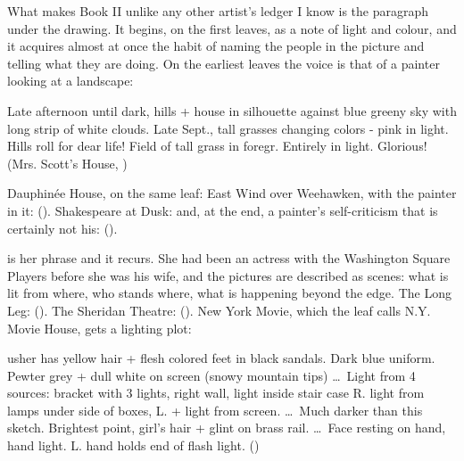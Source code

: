 What makes Book II unlike any other artist's ledger I know is the paragraph under the drawing. It begins, on the first leaves, as a note of light and colour, and it acquires almost at once the habit of naming the people in the picture and telling what they are doing. On the earliest leaves the voice is that of a painter looking at a landscape:

\begin{leafquote}
Late afternoon until dark, hills + house in silhouette against blue greeny sky with long strip of white clouds. Late Sept., tall grasses changing colors - pink in light. Hills roll for dear life! Field of tall grass in foregr. Entirely in light. Glorious! \hfill (Mrs. Scott's House, )
\end{leafquote}

\noindent Dauphinée House, on the same leaf:  East Wind over Weehawken, with the painter in it:  (). Shakespeare at Dusk:  and, at the end, a painter's self-criticism that is certainly not his:  ().

 is her phrase and it recurs. She had been an actress with the Washington Square Players before she was his wife, and the pictures are described as scenes: what is lit from where, who stands where, what is happening beyond the edge. The Long Leg:  (). The Sheridan Theatre:  (). New York Movie, which the leaf calls N.Y. Movie House, gets a lighting plot:

\begin{leafquote}
usher has yellow hair + flesh colored feet in black sandals. Dark blue uniform. Pewter grey + dull white on screen (snowy mountain tips) \ldots\ Light from 4 sources: bracket with 3 lights, right wall, light inside stair case R. light from lamps under side of boxes, L. + light from screen. \ldots\ Much darker than this sketch. Brightest point, girl's hair + glint on brass rail. \ldots\ Face resting on hand, hand light. L. hand holds end of flash light. \hfill ()
\end{leafquote}


